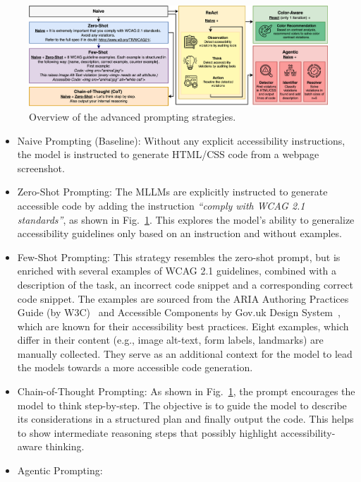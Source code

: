\begin{figure}
  \centering
  \includegraphics[width=0.85\linewidth]{figures/prompts_new_new.png}
  \caption{Overview of the advanced prompting strategies.}
  \label{fig:prompts_new} 
\end{figure}


\begin{itemize}
    \item Naive Prompting (Baseline): Without any explicit accessibility instructions, the model is
    instructed to generate HTML/CSS code from a webpage screenshot.
    \item Zero-Shot Prompting: The MLLMs are explicitly instructed to 
    generate accessible code by adding the instruction \textit{``comply with WCAG 2.1 standards''}, 
    as shown in Fig.~\ref{fig:prompts_new}. 
    This explores the model's ability to generalize accessibility guidelines 
    only based on an instruction and without examples.
    \item Few-Shot Prompting: This strategy resembles the zero-shot prompt,
    but is enriched with several examples of WCAG 2.1 guidelines, combined 
    with a description of the task, an incorrect code snippet and a 
    corresponding correct code snippet.
    The examples are sourced from the ARIA Authoring Practices Guide 
    (by W3C)~\cite{web:w3c_examples} and Accessible Components by Gov.uk 
    Design System~\cite{web:govuk}, which are known for their accessibility
    best practices.
    Eight examples, which differ in their content (e.g., image alt-text, 
    form labels, landmarks) are manually collected. They serve as an 
    additional context for the model to lead the models towards a more 
    accessible code generation.
    \item Chain-of-Thought Prompting: As shown in Fig.~\ref{fig:prompts_new}, 
    the prompt encourages the model to think step-by-step. 
    The objective is to guide the model to describe its 
    considerations in a structured plan and finally output the code.
    This helps to show intermediate reasoning steps that possibly 
    highlight accessibility-aware thinking.
    \item Agentic Prompting: 

\end{itemize}
